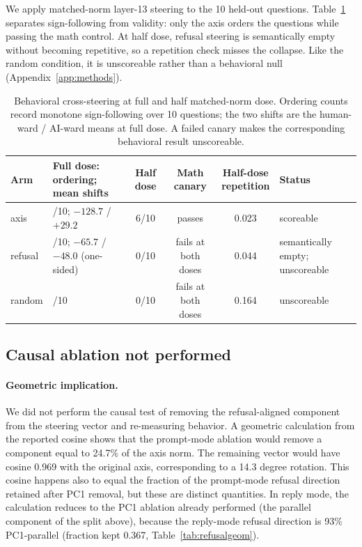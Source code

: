 We apply matched-norm layer-13 steering to the 10 held-out questions.
Table~\ref{tab:refusalsteer} separates sign-following from validity: only the
axis orders the questions while passing the math control. At half dose, refusal
steering is semantically empty without becoming repetitive, so a repetition
check misses the collapse. Like the random condition, it is unscoreable rather
than a behavioral null (Appendix~\ref{app:methods}).

\FloatBarrier

\begin{table}[!ht]
\caption{Behavioral cross-steering at full and half matched-norm dose. Ordering
counts record monotone sign-following over 10 questions; the two shifts are the
human-ward / AI-ward means at full dose. A failed canary makes the corresponding
behavioral result unscoreable.}
\label{tab:refusalsteer}
\centering
\scriptsize
\setlength{\tabcolsep}{3pt}
\begin{tabular}{@{}l>{\raggedright\arraybackslash}p{1.8in}ccc>{\raggedright\arraybackslash}p{1.2in}@{}}
\toprule
Arm & Full dose: ordering; mean shifts & Half dose & Math canary & \shortstack{Half-dose\\repetition} & Status \\
\midrule
axis & 10/10; $-128.7$ / $+29.2$ & 6/10 & passes & 0.023 & scoreable \\
refusal & 0/10; $-65.7$ / $-48.0$ (one-sided) & 0/10 & fails at both doses & 0.044 & semantically empty; unscoreable \\
random & 0/10 & 0/10 & fails at both doses & 0.164 & unscoreable \\
\bottomrule
\end{tabular}
\end{table}

\FloatBarrier

\subsection{Causal ablation not performed}

\paragraph{Geometric implication.}
We did not perform the causal test of removing the refusal-aligned component
from the steering vector and re-measuring behavior. A geometric calculation
from the reported cosine shows that the prompt-mode ablation would remove a
component equal to 24.7\% of the axis norm. The remaining vector would have
cosine 0.969 with the original axis, corresponding to a 14.3 degree rotation.
This cosine happens also to equal the fraction of the prompt-mode refusal
direction retained after PC1 removal, but these are distinct quantities. In
reply mode, the calculation reduces to the PC1 ablation already performed
(the parallel component of the split above), because the reply-mode refusal
direction is 93\% PC1-parallel (fraction kept 0.367,
Table~\ref{tab:refusalgeom}).

